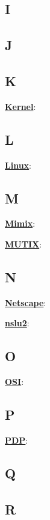 \subsection{I}

\subsection{J}

\subsection{K}

\underline{\textbf{Kernel}}: %

\subsection{L}

\underline{\textbf{Linux}}: %

\subsection{M}

\underline{\textbf{Mimix}}: %

\underline{\textbf{MUTIX}}: %

\subsection{N}

\underline{\textbf{Netscape}}: %

\underline{\textbf{nslu2}}: %

\subsection{O}

\underline{\textbf{OSI}}: %

\subsection{P}

\underline{\textbf{PDP}}: %

\subsection{Q}

\subsection{R}

